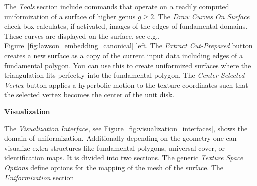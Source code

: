 \documentclass[Thesis.tex]{subfiles}
\begin{document}
The \emph{Tools} section include commands that operate on a readily computed uniformization of a surface of higher genus $g\geq 2$. The \emph{Draw Curves On Surface} check box calculates, if activated, images of the edges of fundamental domains. These curves are displayed on the surface, see e.g., Figure~\ref{fig:lawson_embedding_canonical} left. The \emph{Extract Cut-Prepared} button creates a new surface as a copy of the current input data including edges of a fundamental polygon. You can use this to create uniformized surfaces where the triangulation fits perfectly into the fundamental polygon. The \emph{Center Selected Vertex} button applies a hyperbolic motion to the texture coordinates such that the selected vertex becomes the center of the unit disk.

{\bf Visualization}

The \emph{Visualization Interface}, see Figure~\ref{fig:visualization_interfaces}, shows the domain of uniformization. Additionally depending on the geometry one can visualize extra structures like fundamental polygons, universal cover, or identification maps. It is divided into two sections. The generic \emph{Texture Space Options} define options for the mapping of the mesh of the surface. The \emph{Uniformization} section   


\subfilebibliography
\end{document}

